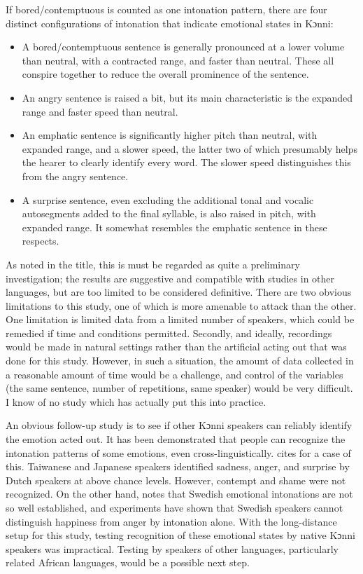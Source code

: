 \documentclass[output=paper]{langsci/langscibook}
\begin{document}
If bored/contemptuous is counted as one intonation pattern, there are four distinct configurations of intonation that indicate emotional states in Kɔnni:

\begin{itemize}
\item A bored/contemptuous sentence is generally pronounced at a lower volume than neutral, with a contracted range, and faster than neutral. These all conspire together to reduce the overall prominence of the sentence.
\item An angry sentence is raised a bit, but its main characteristic is the expanded range and faster speed than neutral.
\item An emphatic sentence is significantly higher pitch than neutral, with expanded range, and a slower speed, the latter two of which presumably helps the hearer to clearly identify every word. The slower speed distinguishes this from the angry sentence.
\item A surprise sentence, even excluding the additional tonal and vocalic autosegments added to the final syllable, is also raised in pitch, with expanded range. It somewhat resembles the emphatic sentence in these respects. 
\end{itemize}

As noted in the title, this is must be regarded as quite a preliminary investigation; the results are suggestive and compatible with studies in other languages, but are too limited to be considered definitive. There are two obvious limitations to this study, one of which is more amenable to attack than the other. One limitation is limited data from a limited number of speakers, which could be remedied if time and conditions permitted. Secondly, and ideally, recordings would be made in natural settings rather than the artificial acting out that was done for this study. However, in such a situation, the amount of data collected in a reasonable amount of time would be a challenge, and control of the variables (the same sentence, number of repetitions, same speaker) would be very difficult. I know of no study which has actually put this into practice.

An obvious follow-up study is to see if other Kɔnni speakers can reliably identify the emotion acted out. It has been demonstrated that people can recognize the intonation patterns of some emotions, even cross-linguistically. \citet[72]{gussenhoven2004} cites \citet[128]{vanbezooijen1984} for a case of this. Taiwanese and Japanese speakers identified sadness, anger, and surprise by Dutch speakers at above chance levels. However, contempt and shame were not recognized. On the other hand, \citet[12]{garding1998} notes that Swedish emotional intonations are not so well established, and experiments have shown that Swedish speakers cannot distinguish happiness from anger by intonation alone. With the long-distance setup for this study, testing recognition of these emotional states by native Kɔnni speakers was impractical. Testing by speakers of other languages, particularly related African languages, would be a possible next step.
\end{document}
